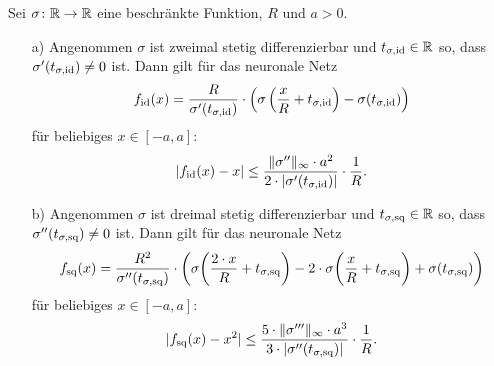 \begin{lem}
  \label{lem:1}
  Sei $\sigma \colon \mathbb{R} \to \mathbb{R}$ eine beschränkte Funktion, $R$ und $a > 0.$
  \begin{itemize}
  \item[a)] Angenommen $\sigma$ ist zweimal stetig differenzierbar und $t_{\sigma,\mathrm{id}} \in \mathbb{R}$ so, dass $\sigma'(t_{\sigma, \mathrm{id}}) \neq 0$ ist. Dann gilt für das neuronale Netz
  $$ f_{\mathrm{id}}(x) = \frac{R}{\sigma'(t_{\sigma, \mathrm{id}})} \cdot \left(\sigma\left(\frac{x}{R} + t_{\sigma, \mathrm{id}}\right) - \sigma(t_{\sigma, \mathrm{id}})\right)$$
  für beliebiges $x \in [-a, a]\colon$ 
  $$ |f_{\mathrm{id}}(x) - x| \leq \frac{\|\sigma''\|_{\infty} \cdot a^2}{2 \cdot |\sigma'(t_{\sigma, \mathrm{id}})|} \cdot \frac{1}{R}.$$
  \item[b)] Angenommen $\sigma$ ist dreimal stetig differenzierbar und $t_{\sigma,\mathrm{sq}} \in \mathbb{R}$ so, dass $\sigma''(t_{\sigma, \mathrm{sq}}) \neq 0$ ist. Dann gilt für das neuronale Netz
  $$ f_{\mathrm{sq}}(x) = \frac{R^2}{\sigma''(t_{\sigma, \mathrm{sq}})} \cdot \left(\sigma\bigg(\frac{2 \cdot x}{R} + t_{\sigma, \mathrm{sq}}\bigg) - 2 \cdot \sigma\bigg(\frac{x}{R} + t_{\sigma, \mathrm{sq}}\bigg)+ \sigma(t_{\sigma, \mathrm{sq}})\right)$$
  für beliebiges $x \in [-a, a]\colon$ 
  $$ |f_{\mathrm{sq}}(x) - x^2| \leq \frac{5 \cdot \|\sigma'''\|_{\infty} \cdot a^3}{3 \cdot |\sigma''(t_{\sigma, \mathrm{sq}})|} \cdot \frac{1}{R}.$$
  \end{itemize}
\end{lem}
